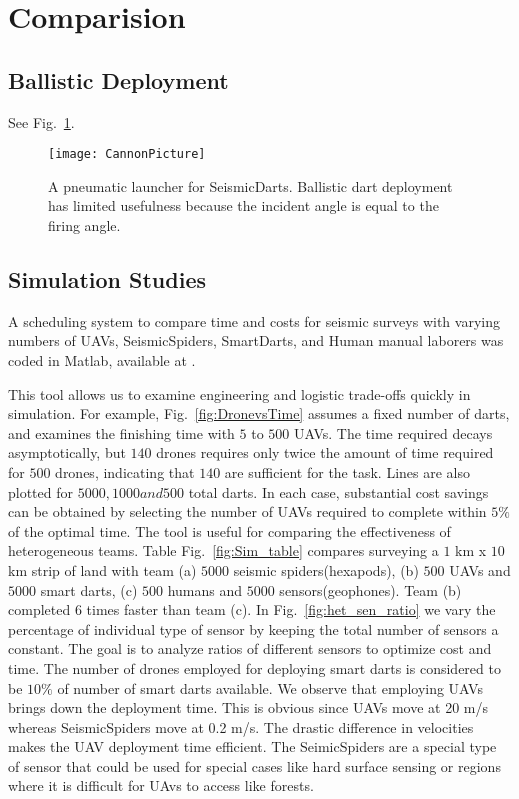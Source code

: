 \section{Comparision}\label{sec:Comparision}

\subsection{Ballistic Deployment}
See Fig.~\ref{fig:TradvsAutoDrop}.

\begin{figure} \centering
  {\texttt{[image: CannonPicture]}}
 \caption{A pneumatic launcher for SeismicDarts.  Ballistic dart deployment has limited usefulness because the incident angle is equal to the firing angle.} 
 \label{fig:TradvsAutoDrop}
\end{figure}



\subsection{Simulation Studies}

A scheduling system to compare  time and costs for seismic surveys with varying numbers of UAVs, SeismicSpiders, SmartDarts, and Human manual laborers was coded in  {\sc Matlab}, available at \cite{Srikanth2016seismicScheduler}.

This tool allows us to examine engineering and logistic trade-offs quickly in simulation.  For example, Fig.~\ref{fig:DronevsTime} assumes a fixed number of darts, and examines the finishing time with $5$ to $500$ UAVs.  The time required decays asymptotically, but $140$ drones requires only twice the amount of time required for $500$ drones, indicating that $140$ are sufficient for the task. Lines are also plotted for $5000, 1000 and 500$ total darts.  In each case, substantial cost savings can be obtained by selecting the number of UAVs required to complete within $5\%$ of the optimal time.
The tool is useful for comparing the effectiveness of heterogeneous teams.  Table Fig.~\ref{fig:Sim_table} compares surveying a $1$ km x $10$ km strip of land with team (a) $5000$ seismic spiders(hexapods), (b) $500$ UAVs and $5000$ smart darts, (c) $500$ humans and $5000$ sensors(geophones).  Team (b) completed $6$ times faster than team (c).
In Fig.~\ref{fig:het_sen_ratio} we vary the percentage of individual type of sensor by keeping the total number of sensors a constant. The goal is to analyze ratios of different sensors to optimize cost and time. The number of drones employed for deploying smart darts is considered to be $10\%$ of number of smart darts available. We observe that employing UAVs brings down the deployment time. This is obvious since UAVs move at 20 m/s whereas SeismicSpiders move at 0.2 m/s. The drastic difference in velocities makes the UAV deployment time efficient. The SeimicSpiders are a special type of sensor that could be used for special cases like hard surface sensing or regions where it is difficult for UAvs to access like forests.

